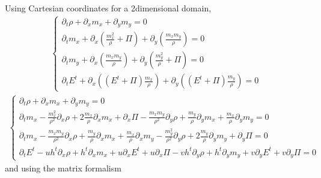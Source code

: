 \documentclass[letterpaper,10pt,english]{jupyterBook}
\begin{document}
\sphinxAtStartPar
Using Cartesian coordinates for a 2\sphinxhyphen{}dimensional domain,
\begin{equation*}
\begin{split}\begin{cases}
  \partial_t \rho + \partial_x m_x + \partial_y m_y = 0 \\
  \partial_t m_x + \partial_x \left( \frac{m_x^2}{\rho} + \Pi \right) + \partial_y \left( \frac{m_x m_y}{\rho}     \right) = 0 \\
  \partial_t m_y + \partial_x \left( \frac{m_x m_y}{\rho}     \right) + \partial_y \left( \frac{m_y^2}{\rho} + \Pi \right) = 0 \\
  \partial_t E^t + \partial_x \left( \left( E^t + \Pi \right) \frac{m_x}{\rho} \right) + \partial_y \left( \left( E^t + \Pi \right) \frac{m_y}{\rho} \right) = 0
\end{cases}\end{split}
\end{equation*}\begin{equation*}
\begin{split}\begin{cases}
  \partial_t \rho + \partial_x m_x + \partial_y m_y = 0 \\
  \partial_t m_x - \frac{m_x^2}{\rho^2} \partial_x \rho + 2 \frac{m_x}{\rho} \partial_x m_x + \partial_x \Pi - \frac{m_x m_y}{\rho^2} \partial_y \rho + \frac{m_y}{\rho} \partial_y m_x + \frac{m_x}{\rho} \partial_y m_y = 0 \\
  \partial_t m_x  - \frac{m_x m_y}{\rho^2} \partial_x \rho + \frac{m_y}{\rho} \partial_x m_x + \frac{m_x}{\rho} \partial_x m_y - \frac{m_y^2}{\rho^2} \partial_y \rho + 2 \frac{m_y}{\rho} \partial_y m_y + \partial_y \Pi= 0 \\
  \partial_t E^t - u h^t \partial_x \rho + h^t \partial_x m_x + u \partial_x E^t + u \partial_x \Pi - v h^t \partial_y \rho + h^t \partial_y m_y + v \partial_y E^t + v \partial_y \Pi = 0
\end{cases}\end{split}
\end{equation*}
\sphinxAtStartPar
and using the matrix formalism
\end{document}
